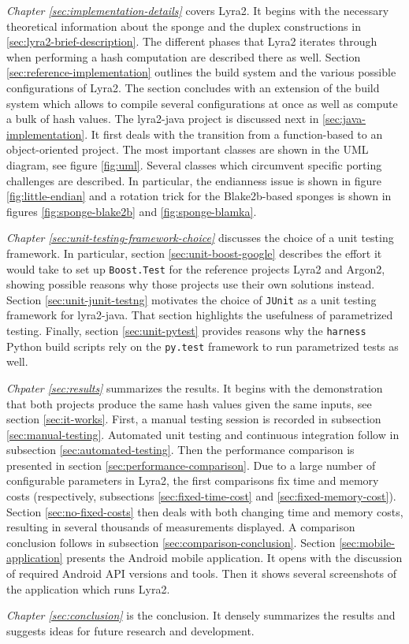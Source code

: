 \emph{Chapter \ref{sec:implementation-details}} covers Lyra2. It begins with the necessary theoretical information about the sponge and the duplex constructions in \ref{sec:lyra2-brief-description}. The different phases that Lyra2 iterates through when performing a hash computation are described there as well. Section \ref{sec:reference-implementation} outlines the build system and the various possible configurations of Lyra2. The section concludes with an extension of the build system which allows to compile several configurations at once as well as compute a bulk of hash values. The lyra2-java project is discussed next in \ref{sec:java-implementation}. It first deals with the transition from a function-based to an object-oriented project. The most important classes are shown in the UML diagram, see figure \ref{fig:uml}. Several classes which circumvent specific porting challenges are described. In particular, the endianness issue is shown in figure \ref{fig:little-endian} and a rotation trick for the Blake2b-based sponges is shown in figures \ref{fig:sponge-blake2b} and \ref{fig:sponge-blamka}.

\emph{Chapter \ref{sec:unit-testing-framework-choice}} discusses the choice of a unit testing framework. In particular, section \ref{sec:unit-boost-google} describes the effort it would take to set up \texttt{Boost.Test} for the reference projects Lyra2 and Argon2, showing possible reasons why those projects use their own solutions instead. Section \ref{sec:unit-junit-testng} motivates the choice of \texttt{JUnit} as a unit testing framework for lyra2-java. That section highlights the usefulness of parametrized testing. Finally, section \ref{sec:unit-pytest} provides reasons why the \texttt{harness} Python build scripts rely on the \texttt{py.test} framework to run parametrized tests as well.

\emph{Chpater \ref{sec:results}} summarizes the results. It begins with the demonstration that both projects produce the same hash values given the same inputs, see section \ref{sec:it-works}. First, a manual testing session is recorded in subsection \ref{sec:manual-testing}. Automated unit testing and continuous integration follow in subsection \ref{sec:automated-testing}. Then the performance comparison is presented in section \ref{sec:performance-comparison}. Due to a large number of configurable parameters in Lyra2, the first comparisons fix time and memory costs (respectively, subsections \ref{sec:fixed-time-cost} and \ref{sec:fixed-memory-cost}). Section \ref{sec:no-fixed-costs} then deals with both changing time and memory costs, resulting in several thousands of measurements displayed. A comparison conclusion follows in subsection \ref{sec:comparison-conclusion}. Section \ref{sec:mobile-application} presents the Android mobile application. It opens with the discussion of required Android API versions and tools. Then it shows several screenshots of the application which runs Lyra2.

\emph{Chapter \ref{sec:conclusion}} is the conclusion. It densely summarizes the results and suggests ideas for future research and development.
